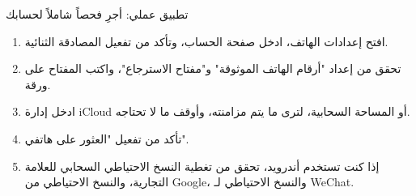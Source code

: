\begin{tcbpractice}{تطبيق عملي: أجرِ فحصاً شاملاً لحسابك}
\begin{enumerate}
  \item افتح إعدادات الهاتف، ادخل صفحة الحساب، وتأكد من تفعيل المصادقة الثنائية.
  \item تحقق من إعداد "أرقام الهاتف الموثوقة" و"مفتاح الاسترجاع"، واكتب المفتاح على ورقة.
  \item ادخل إدارة iCloud أو المساحة السحابية، لترى ما يتم مزامنته، وأوقف ما لا تحتاجه.
  \item تأكد من تفعيل "العثور على هاتفي".
  \item إذا كنت تستخدم أندرويد، تحقق من تغطية النسخ الاحتياطي السحابي للعلامة التجارية، والنسخ الاحتياطي من Google، والنسخ الاحتياطي لـ WeChat.
\end{enumerate}

\end{tcbpractice}
